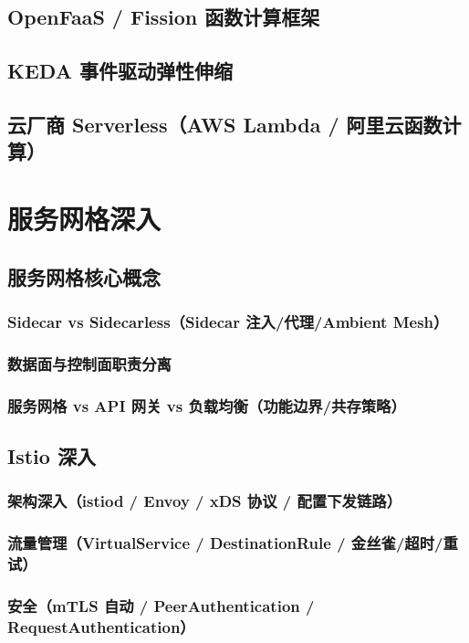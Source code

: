 \documentclass[12pt,UTF8]{ctexbook}
\begin{document}
  \section{OpenFaaS / Fission 函数计算框架}
  \section{KEDA 事件驱动弹性伸缩}
  \section{云厂商 Serverless（AWS Lambda / 阿里云函数计算）}


\chapter{服务网格深入}
\label{chap:service-mesh-deep}

  \section{服务网格核心概念}
    \subsection{Sidecar vs Sidecarless（Sidecar 注入/代理/Ambient Mesh）}
    \subsection{数据面与控制面职责分离}
    \subsection{服务网格 vs API 网关 vs 负载均衡（功能边界/共存策略）}

  \section{Istio 深入}
    \subsection{架构深入（istiod / Envoy / xDS 协议 / 配置下发链路）}
    \subsection{流量管理（VirtualService / DestinationRule / 金丝雀/超时/重试）}
    \subsection{安全（mTLS 自动 / PeerAuthentication / RequestAuthentication）}
\end{document}
